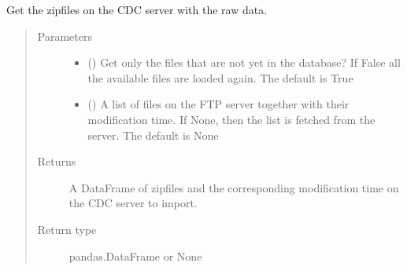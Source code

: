 \documentclass[letterpaper,10pt,english]{sphinxmanual}
\begin{document}
\begin{fulllineitems}

\begin{fulllineitems}
\label{\detokenize{weatherDB:weatherDB.station.StationBase.get_zipfiles}}
\sphinxAtStartPar
Get the zipfiles on the CDC server with the raw data.
\begin{quote}\begin{description}
\item[{Parameters}] \leavevmode\begin{itemize}
\item {} 
\sphinxAtStartPar
{} (\sphinxstyleliteralemphasis{\sphinxupquote{, }}) \textendash{} Get only the files that are not yet in the database?
If False all the available files are loaded again.
The default is True

\item {} 
\sphinxAtStartPar
{} (\sphinxstyleliteralemphasis{\sphinxupquote{ (}}\sphinxstyleliteralemphasis{\sphinxupquote{, }}\sphinxstyleliteralemphasis{\sphinxupquote{)}}\sphinxstyleliteralemphasis{\sphinxupquote{, }}) \textendash{} A list of files on the FTP server together with their modification time.
If None, then the list is fetched from the server.
The default is None

\end{itemize}

\item[{Returns}] \leavevmode
\sphinxAtStartPar
A DataFrame of zipfiles and the corresponding modification time on the CDC server to import.

\item[{Return type}] \leavevmode
\sphinxAtStartPar
pandas.DataFrame or None

\end{description}\end{quote}


\end{fulllineitems}
\end{fulllineitems}
\end{document}
